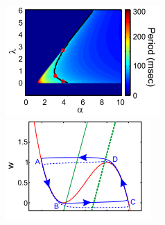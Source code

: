 \begin{figure}[h]
\centering
        \begin{minipage}{0.33\linewidth}
            \begin{center}
                \includegraphics[width=1\linewidth]{Images/photo5_1.png}
            \end{center}
        \end{minipage} 
        \begin{minipage}{0.3\linewidth}
            \begin{center}
                \includegraphics[width=1\linewidth]{Images/photo5_2.png}
            \end{center}
        \end{minipage} 
    \begin{minipage}{0.29\linewidth}
        \begin{center}

\end{center}
\end{minipage}
\end{figure}
